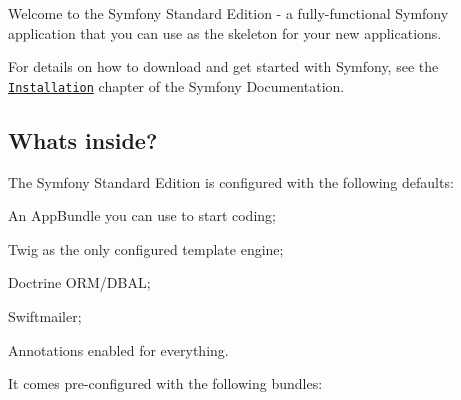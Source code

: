 Welcome to the Symfony Standard Edition -\/ a fully-\/functional Symfony application that you can use as the skeleton for your new applications.

For details on how to download and get started with Symfony, see the \href{https://symfony.com/doc/3.2/setup.html}{\tt Installation} chapter of the Symfony Documentation.

\subsection*{What\textquotesingle{}s inside? }

The Symfony Standard Edition is configured with the following defaults\+:


\begin{DoxyItemize}
\item An App\+Bundle you can use to start coding;
\item Twig as the only configured template engine;
\item Doctrine O\+R\+M/\+D\+B\+AL;
\item Swiftmailer;
\item Annotations enabled for everything.
\end{DoxyItemize}

It comes pre-\/configured with the following bundles\+:


